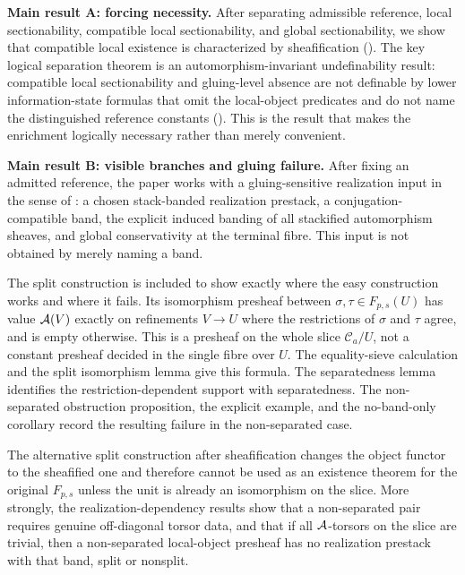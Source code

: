 \medskip
\noindent\textbf{Main result A: forcing necessity.}
After separating admissible reference, local sectionability, compatible local sectionability, and global sectionability, we show that compatible local existence is characterized by sheafification (). The key logical separation theorem is an automorphism-invariant undefinability result: compatible local sectionability and gluing-level absence are not definable by lower information-state formulas that omit the local-object predicates and do not name the distinguished reference constants (). This is the result that makes the enrichment logically necessary rather than merely convenient.

\medskip
\noindent\textbf{Main result B: visible branches and gluing failure.}
After fixing an admitted reference, the paper works with a gluing-sensitive realization input in the sense of : a chosen stack-banded realization prestack, a conjugation-compatible band, the explicit induced banding of all stackified automorphism sheaves, and global conservativity at the terminal fibre. This input is not obtained by merely naming a band.

The split construction is included to show exactly where the easy construction works and where it fails. Its isomorphism presheaf between $\sigma,\tau\in F_{p,s}(U)$ has value $\mathcal{A}(V)$ exactly on refinements $V\to U$ where the restrictions of $\sigma$ and $\tau$ agree, and is empty otherwise. This is a presheaf on the whole slice $\mathcal C_a/U$, not a constant presheaf decided in the single fibre over $U$. The equality-sieve calculation and the split isomorphism lemma give this formula. The separatedness lemma identifies the restriction-dependent support with separatedness. The non-separated obstruction proposition, the explicit example, and the no-band-only corollary record the resulting failure in the non-separated case.

The alternative split construction after sheafification changes the object functor to the sheafified one and therefore cannot be used as an existence theorem for the original $F_{p,s}$ unless the unit is already an isomorphism on the slice. More strongly, the realization-dependency results show that a non-separated pair requires genuine off-diagonal torsor data, and that if all $\mathcal{A}$-torsors on the slice are trivial, then a non-separated local-object presheaf has no realization prestack with that band, split or nonsplit.

